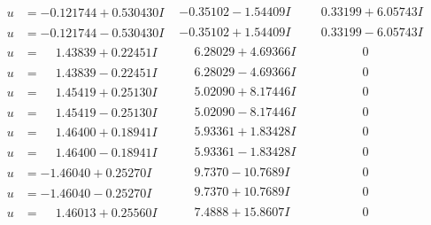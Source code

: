 \documentclass[1p]{elsarticle_modified}
\theoremstyle{definition}
\begin{document}
$$\begin{array}{c|c|c}
\begin{aligned}
u &= -0.121744 + 0.530430 I\end{aligned}
 & -0.35102 - 1.54409 I & \phantom{-}0.33199 + 6.05743 I \\ \hline\begin{aligned}
u &= -0.121744 - 0.530430 I\end{aligned}
 & -0.35102 + 1.54409 I & \phantom{-}0.33199 - 6.05743 I \\ \hline\begin{aligned}
u &= \phantom{-}1.43839 + 0.22451 I\end{aligned}
 & \phantom{-}6.28029 + 4.69366 I & \phantom{-0.000000 } 0 \\ \hline\begin{aligned}
u &= \phantom{-}1.43839 - 0.22451 I\end{aligned}
 & \phantom{-}6.28029 - 4.69366 I & \phantom{-0.000000 } 0 \\ \hline\begin{aligned}
u &= \phantom{-}1.45419 + 0.25130 I\end{aligned}
 & \phantom{-}5.02090 + 8.17446 I & \phantom{-0.000000 } 0 \\ \hline\begin{aligned}
u &= \phantom{-}1.45419 - 0.25130 I\end{aligned}
 & \phantom{-}5.02090 - 8.17446 I & \phantom{-0.000000 } 0 \\ \hline\begin{aligned}
u &= \phantom{-}1.46400 + 0.18941 I\end{aligned}
 & \phantom{-}5.93361 + 1.83428 I & \phantom{-0.000000 } 0 \\ \hline\begin{aligned}
u &= \phantom{-}1.46400 - 0.18941 I\end{aligned}
 & \phantom{-}5.93361 - 1.83428 I & \phantom{-0.000000 } 0 \\ \hline\begin{aligned}
u &= -1.46040 + 0.25270 I\end{aligned}
 & \phantom{-}9.7370 - 10.7689 I & \phantom{-0.000000 } 0 \\ \hline\begin{aligned}
u &= -1.46040 - 0.25270 I\end{aligned}
 & \phantom{-}9.7370 + 10.7689 I & \phantom{-0.000000 } 0 \\ \hline\begin{aligned}
u &= \phantom{-}1.46013 + 0.25560 I\end{aligned}
 & \phantom{-}7.4888 + 15.8607 I & \phantom{-0.000000 } 0 \\ \hline\begin{aligned}

\end{aligned}
\end{array}$$
\end{document}
